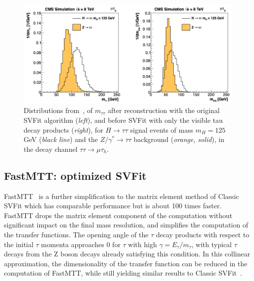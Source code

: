 \begin{figure}[ht]
    \centering
    \includegraphics[width=15cm]{figures/ch-5-object-reconstruction-and-corrections-applied/original_SVFit_resolution_2014_SVFit_Bianchini.png}
    \caption[Distributions of $m_{\tau\tau}$ reconstructed by the classic SVFit algorithm, and masses of visible tau decay products (before SVFit).]{Distributions from~\cite{2014_SVFit_Bianchini}, of $m_{\tau\tau}$ after reconstruction with the original SVFit algorithm (\textit{left}), and before SVFit with only the visible tau decay products (\textit{right}), for $H \rightarrow \tau\tau$ signal events of mass $m_H = 125$ GeV (\textit{black line}) and the $Z/\gamma^* \rightarrow \tau\tau$ background (\textit{orange, solid}), in the decay channel $\tau\tau \rightarrow \mu\tau_{h}$.} 
    \label{fig:classic_svfit_resolution}
\end{figure}


\subsection{FastMTT: optimized SVFit}
FastMTT~\cite{CMS-AN-19-032-FastMTT} is a further simplification to the matrix element method of Classic SVFit which has comparable performance but is about 100 times faster. FastMTT drops the matrix element component of the computation without significant impact on the final mass resolution, and simplifies the computation of the transfer functions. The opening angle of the $\tau$ decay products with respect to the initial $\tau$ momenta approaches 0 for $\tau$ with high $\gamma = E_{\tau}/m_{\tau}$, with typical $\tau$ decays from the Z boson decays already satisfying this condition. In this collinear approximation, the dimensionality of the transfer function can be reduced in the computation of FastMTT, while still yielding similar results to Classic SVFit~\cite{CMS-AN-19-032-FastMTT}. 


